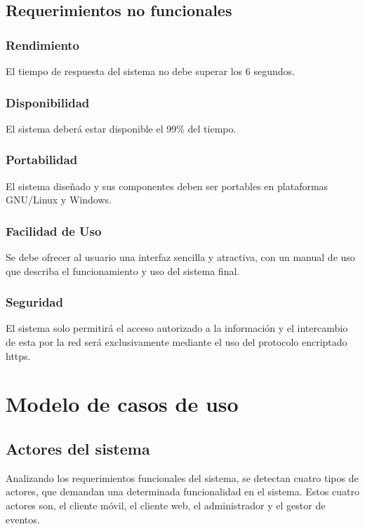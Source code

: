 \subsection{Requerimientos no funcionales}


\subsubsection*{Rendimiento}
El tiempo de respuesta del sistema no debe superar los 6 segundos.

\subsubsection*{Disponibilidad}
El sistema deberá estar disponible el 99\% del tiempo. 

\subsubsection*{Portabilidad}
El sistema diseñado y sus componentes deben ser portables en plataformas GNU/Linux y Windows.

\subsubsection*{Facilidad de Uso}
Se debe ofrecer al usuario una interfaz sencilla y atractiva, con un manual de uso que describa el funcionamiento y uso del sistema final.

\subsubsection*{Seguridad}
El sistema solo permitirá el acceso autorizado a la información y el intercambio de esta por la red será exclusivamente mediante el uso del protocolo encriptado https.

\section{Modelo de casos de uso}

\subsection{Actores del sistema}
Analizando los requerimientos funcionales del sistema, se detectan cuatro tipos de actores, que demandan una determinada funcionalidad en el sistema. Estos cuatro actores son, el cliente móvil, el cliente web, el administrador y el gestor de eventos.


